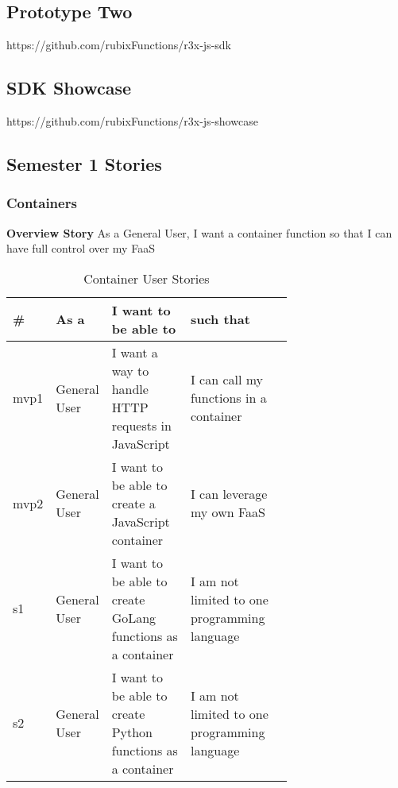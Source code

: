 \documentclass{article}
\begin{document}
\subsection{Prototype Two}
\label{appendix:proto2}
https://github.com/rubixFunctions/r3x-js-sdk

\subsection{SDK Showcase}
\label{appendix:sdkshowcase}
https://github.com/rubixFunctions/r3x-js-showcase

\subsection{Semester 1 Stories}
\label{appendix:stories}
\subsubsection{Containers}
\textbf{Overview Story}
\newline As a General User, I want a container function so that I can have full control over my FaaS
\begin{table}[!ht]
\begin{tabular}{|l|l|p{0.3\linewidth}|p{0.4\linewidth}|}
\hline
\textbf{\#} & \textbf{As a} & \textbf{I want to be able to}                               & \textbf{such that}                           \\ \hline
mvp1        & General User  & I want a way to handle HTTP requests in JavaScript          & I can call my functions in a container       \\ \hline
mvp2        & General User  & I want to be able to create a JavaScript container          & I can leverage my own FaaS                   \\ \hline
s1          & General User  & I want to be able to create GoLang functions as a container & I am not limited to one programming language \\ \hline
s2          & General User  & I want to be able to create Python functions as a container & I am not limited to one programming language \\ \hline
\end{tabular}
\caption{Container User Stories}
\label{tab:container}
\end{table}
\end{document}
